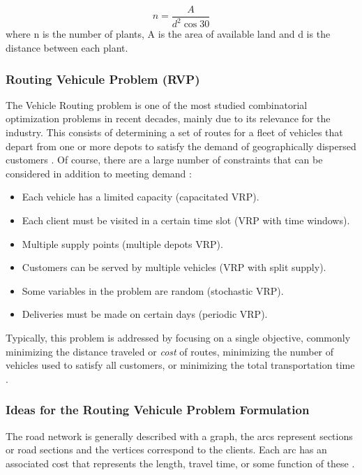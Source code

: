 \documentclass{amsart}
\begin{document}
            \begin{equation}
                n = \frac{A}{d^2 \cos{30}}
            \end{equation}
            where n is the number of plants, A is the area of available land and d is the distance between each plant.


            \subsubsection{Routing Vehicule Problem (RVP)}
            The Vehicle Routing problem is one of the most studied combinatorial optimization problems in recent decades, mainly due to its relevance for the industry. This consists of determining a set of routes for a fleet of vehicles that depart from one or more depots to satisfy the demand of geographically dispersed customers \parencite{Sarmiento2014}. Of course, there are a large number of constraints that can be considered in addition to meeting demand \parencite{Toth2002}:

            \begin{itemize}
                \item Each vehicle has a limited capacity (capacitated VRP).
                \item Each client must be visited in a certain time slot (VRP with time windows).
                \item Multiple supply points (multiple depots VRP).
                \item Customers can be served by multiple vehicles (VRP with split supply).
                \item Some variables in the problem are random (stochastic VRP).
                \item Deliveries must be made on certain days (periodic VRP).
            \end{itemize}

            Typically, this problem is addressed by focusing on a single objective, commonly minimizing the distance traveled or \textit{cost} of routes, minimizing the number of vehicles used to satisfy all customers, or minimizing the total transportation time \parencite{Toth2002, García2010}.

            \subsubsection*{Ideas for the Routing Vehicule Problem Formulation}
            The road network is generally described with a graph, the arcs represent sections or road sections and the vertices correspond to the clients. Each arc has an associated cost that represents the length, travel time, or some function of these \parencite{García2010}.
\end{document}
